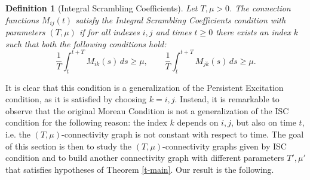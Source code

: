 \documentclass[journal]{article}
\newtheorem{definition}[lemma]{Definition}
\begin{document}
\begin{definition}[Integral Scrambling Coefficients] Let $T,\mu>0$. The connection functions $M_{ij}(t)$ satisfy the Integral Scrambling Coefficients condition with parameters $(T,\mu)$ if for all indexes $i,j$ and times $t\geq 0$ there exists an index $k$ such that both the following conditions hold: $$\frac1T \int_t^{t+T}M_{ik}(s)\,ds\geq \mu,\qquad
\frac1T \int_t^{t+T}M_{jk}(s)\,ds\geq \mu.$$
\end{definition}
It is clear that this condition is a generalization of the Persistent Excitation condition, as it is satisfied by choosing $k=i,j$. Instead, it is remarkable to observe that the original Moreau Condition is not a generalization of the ISC condition for the following reason: the index $k$ depends on $i,j$, but also on time $t$, i.e. the  $(T,\mu)$-connectivity graph is not constant with respect to time. The goal of this section is then to study the $(T,\mu)$-connectivity graphs given by ISC condition and to build another connectivity graph with different parameters $T',\mu'$ that satisfies hypotheses of Theorem \ref{t-main}. Our result is the following.
\end{document}
